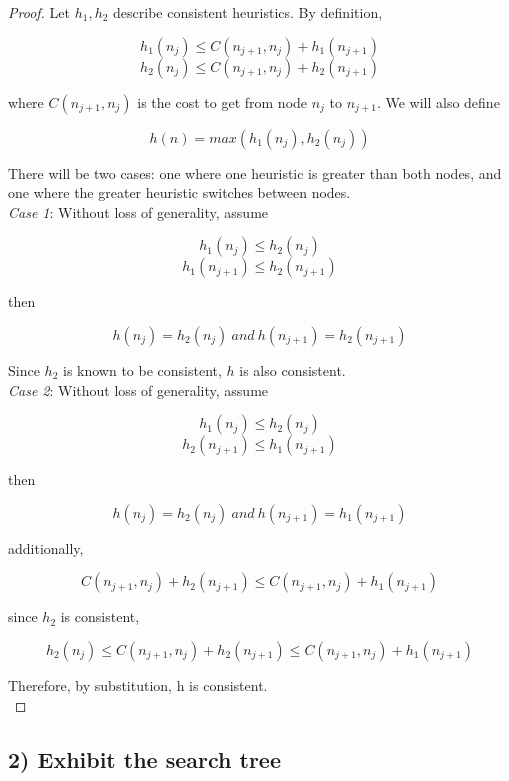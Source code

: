 \documentclass{article}
\begin{document}
\begin{proof}

	Let $h_{1}, h_{2}$ describe consistent heuristics. By definition,

	\[h_{1}(n_{j}) \leq C(n_{j+1}, n_{j}) + h_{1}(n_{j + 1})\]
	\[h_{2}(n_{j}) \leq C(n_{j+1}, n_{j}) + h_{2}(n_{j + 1})\]

	where $C(n_{j+1}, n_{j})$ is the cost to get from node $n_{j}$ to $n_{j + 1} $. We will also define

	\[h(n) = max(h_{1}(n_{j}), h_{2}(n_{j}))\]

	There will be two cases: one where one heuristic is greater than both nodes, and one where the greater heuristic switches between nodes.\\

\newpage
	\emph{Case 1}: Without loss of generality, assume
	
	\[h_{1}(n_{j}) \leq h_{2}(n_{j})\]
	\[h_{1}(n_{j + 1}) \leq h_{2}(n_{j + 1})\]
	
	then
	
	\[h(n_{j}) = h_{2}(n_{j})\ and\ h(n_{j + 1}) = h_{2}(n_{j + 1})\]
	
	Since $h_{2}$ is known to be consistent, $h$ is also consistent.\\

	\emph{Case 2}: Without loss of generality, assume
		
		\[h_{1}(n_{j}) \leq h_{2}(n_{j})\]
		\[h_{2}(n_{j + 1}) \leq h_{1}(n_{j + 1})\]
		
		then
			
		\[h(n_{j}) = h_{2}(n_{j})\ and\ h(n_{j + 1}) = h_{1}(n_{j + 1})\]
		
		additionally,
		
		\[C(n_{j+1}, n_{j}) + h_{2}(n_{j + 1}) \leq C(n_{j+1}, n_{j}) + h_{1}(n_{j + 1})\]
		
		since $h_{2}$ is consistent,
		
		\[h_{2}(n_{j}) \leq C(n_{j+1}, n_{j}) + h_{2}(n_{j + 1}) \leq C(n_{j+1}, n_{j}) + h_{1}(n_{j + 1})\]
		
		Therefore, by substitution, h is consistent.\\

\end{proof}

\newpage
\subsection*{2) Exhibit the search tree}
\end{document}

